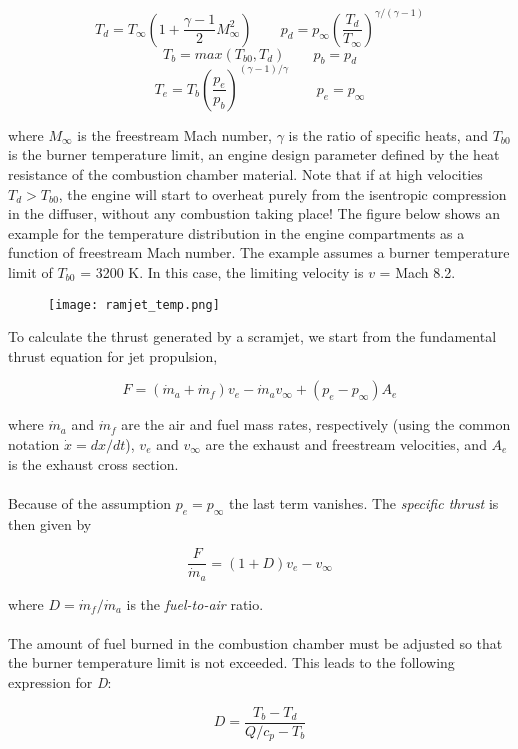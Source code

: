 \documentclass[Orbiter Developer Manual.tex]{subfiles}
\begin{document}
\[ T_{d} = T_{\infty}\left(1 + \frac{\gamma - 1}{2} M_{\infty}^{2}\right) \qquad p_{d} = p_{\infty}\left(\frac{T_{d}}{T_{\infty}}\right)^{\gamma / (\gamma - 1)} \]
\[ T_{b} = max(T_{b0},T_{d}) \qquad p_{b} = p_{d} \]
\[ T_{e} = T_{b}\left(\frac{p_{e}}{p_{b}}\right)^{(\gamma - 1) / \gamma} \qquad p_{e} = p_{\infty} \]

\noindent
where $M_{\infty}$ is the freestream Mach number, $\gamma$ is the ratio of specific heats, and $T_{b0}$ is the burner temperature limit, an engine design parameter defined by the heat resistance of the combustion chamber material. Note that if at high velocities $T_{d} > T_{b0}$, the engine will start to overheat purely from the isentropic compression in the diffuser, without any combustion taking place! The figure below shows an example for the temperature distribution in the engine compartments as a function of freestream Mach number. The example assumes a burner temperature limit of $T_{b0}$ = 3200 K. In this case, the limiting velocity is $v$ = Mach 8.2.

\begin{figure}[H]
  \centering
  \texttt{[image: ramjet\_temp.png]}
\end{figure}

\noindent
To calculate the thrust generated by a scramjet, we start from the fundamental thrust equation for jet propulsion,

\[ F = (\dot{m}_{a} + \dot{m}_{f})v_{e} - \dot{m}_{a} v_{\infty} + (p_{e} - p_{\infty})A_{e} \]

\noindent
where $\dot{m}_{a}$ and $\dot{m}_{f}$ are the air and fuel mass rates, respectively (using the common notation $\dot{x} = dx / dt$), $v_{e}$ and $v_{\infty}$ are the exhaust and freestream velocities, and $A_{e}$ is the exhaust cross section.\\
\\
Because of the assumption $p_{e} = p_{\infty}$ the last term vanishes. The \textit{specific thrust} is then given by

\[ \frac{F}{\dot{m}_{a}} = (1 + D)v_{e} - v_{\infty} \]

\noindent
where $D = \dot{m}_{f} / \dot{m}_{a}$ is the \textit{fuel-to-air} ratio.\\
\\
The amount of fuel burned in the combustion chamber must be adjusted so that the burner temperature limit is not exceeded. This leads to the following expression for \textit{D}:

\[ D = \frac{T_{b} - T_{d}}{Q / c_{p} - T_{b}} \]
\end{document}
